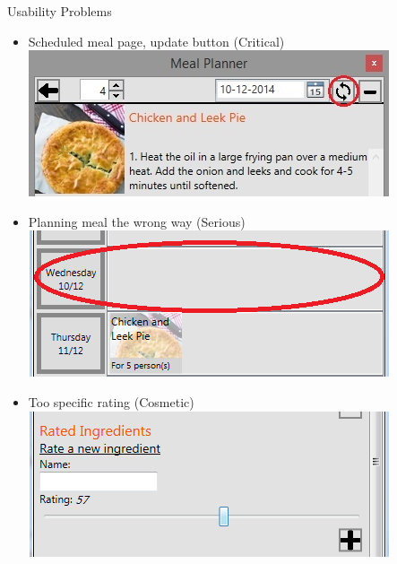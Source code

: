 \begin{frame}{Usability Problems}
    \begin{itemize}
        \item Scheduled meal page, update button (Critical)
        \newline \includegraphics[scale=0.4]{./graphics/UsabilityTest_datepickerRedCircle}
        \item Planning meal the wrong way (Serious)
        \newline \includegraphics[scale=0.4]{./graphics/UsabilityTest_Screenshot02}
        \item Too specific rating (Cosmetic)
        \newline \includegraphics[scale=0.4]{./graphics/UsabilityTest_Screenshot03}
    \end{itemize}
\end{frame}

